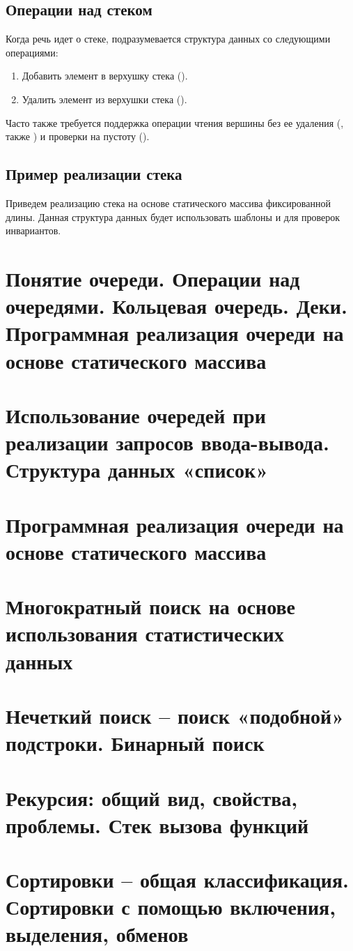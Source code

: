 \subsection{Операции над стеком}
Когда речь идет о стеке, подразумевается структура данных со следующими операциями:
\begin{enumerate}
    \item Добавить элемент в верхушку стека ().
    \item Удалить элемент из верхушки стека ().
\end{enumerate}

Часто также требуется поддержка операции чтения вершины без ее удаления (, также ) и
проверки на пустоту ().

\subsection{Пример реализации стека}
Приведем реализацию стека на основе статического массива фиксированной длины. Данная структура данных будет использовать шаблоны и 
для проверок инвариантов.

\section{Понятие очереди. Операции над очередями. Кольцевая очередь. Деки.  Программная реализация очереди на основе статического массива}
\section{Использование очередей при реализации запросов ввода-вывода. Структура данных «список»}
\section{Программная реализация очереди на основе статического массива}
\section{Многократный поиск на основе использования статистических данных}
\section{Нечеткий поиск – поиск «подобной» подстроки. Бинарный поиск}
\section{Рекурсия: общий вид, свойства, проблемы. Стек вызова функций}
\section{Сортировки – общая классификация. Сортировки с помощью включения, выделения, обменов}
